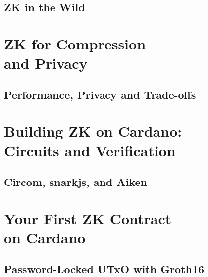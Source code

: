 \chapter{ZK in the Wild} \label{ch:web3}


\part{ZK for Compression\\and Privacy}
\newpage
\chapter{Performance, Privacy and Trade-offs} \label{ch:compression}


\part{Building ZK on Cardano:\\Circuits and Verification}
\newpage
\chapter{Circom, snarkjs, and Aiken} \label{ch:circuits}


\part{Your First ZK Contract\\on Cardano}
\newpage
\chapter{Password-Locked UTxO with Groth16} \label{ch:password}


